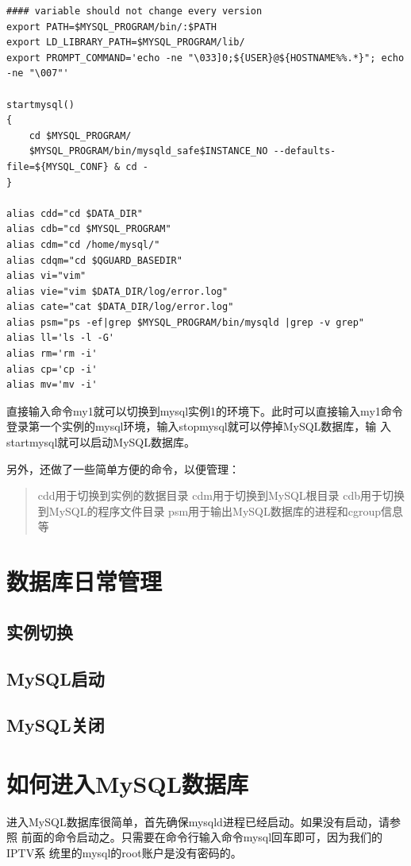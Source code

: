 \begin{enumerate}[itemsep=0pt,parsep=0pt]
\begin{verbatim}
#### variable should not change every version
export PATH=$MYSQL_PROGRAM/bin/:$PATH
export LD_LIBRARY_PATH=$MYSQL_PROGRAM/lib/
export PROMPT_COMMAND='echo -ne "\033]0;${USER}@${HOSTNAME%%.*}"; echo -ne "\007"'

startmysql()
{
	cd $MYSQL_PROGRAM/
	$MYSQL_PROGRAM/bin/mysqld_safe$INSTANCE_NO --defaults-file=${MYSQL_CONF} & cd -
}

alias cdd="cd $DATA_DIR"
alias cdb="cd $MYSQL_PROGRAM"
alias cdm="cd /home/mysql/"
alias cdqm="cd $QGUARD_BASEDIR"
alias vi="vim"
alias vie="vim $DATA_DIR/log/error.log"
alias cate="cat $DATA_DIR/log/error.log"
alias psm="ps -ef|grep $MYSQL_PROGRAM/bin/mysqld |grep -v grep"
alias ll='ls -l -G'
alias rm='rm -i'
alias cp='cp -i'
alias mv='mv -i'
\end{verbatim}

\end{enumerate}

直接输入命令my1就可以切换到mysql实例1的环境下。此时可以直接输入my1命令
登录第一个实例的mysql环境，输入stopmysql就可以停掉MySQL数据库，输
入startmysql就可以启动MySQL数据库。

另外，还做了一些简单方便的命令，以便管理：

\begin{quote}
  cdd用于切换到实例的数据目录
  cdm用于切换到MySQL根目录
  cdb用于切换到MySQL的程序文件目录
  psm用于输出MySQL数据库的进程和cgroup信息等
\end{quote}

\section{数据库日常管理}
\subsection{实例切换}
\subsection{MySQL启动}
\subsection{MySQL关闭}

\section{如何进入MySQL数据库}

进入MySQL数据库很简单，首先确保mysqld进程已经启动。如果没有启动，请参照
前面的命令启动之。只需要在命令行输入命令mysql回车即可，因为我们的IPTV系
统里的mysql的root账户是没有密码的。

